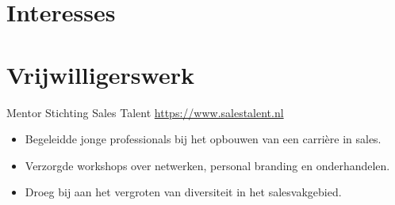 \documentclass[a4paper, serif, 10pt]{moderncv}
\begin{document}
\section{Interesses}

\section{Vrijwilligerswerk}

        {Mentor}
        {Stichting Sales Talent}
        {\url{https://www.salestalent.nl}}
        {}
        {\begin{itemize}
\item Begeleidde jonge professionals bij het opbouwen van een carrière in sales.
\item Verzorgde workshops over netwerken, personal branding en onderhandelen.
\item Droeg bij aan het vergroten van diversiteit in het salesvakgebied.
\end{itemize}}
    
\end{document}
